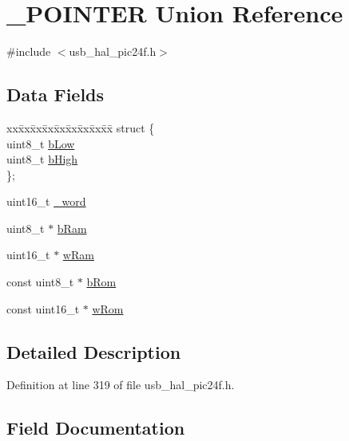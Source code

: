 \hypertarget{union___p_o_i_n_t_e_r}{}\section{\+\_\+\+P\+O\+I\+N\+T\+ER Union Reference}
\label{union___p_o_i_n_t_e_r}


{\ttfamily \#include $<$usb\+\_\+hal\+\_\+pic24f.\+h$>$}

\subsection*{Data Fields}
\begin{DoxyCompactItemize}
\item 
\begin{tabbing}
xx\=xx\=xx\=xx\=xx\=xx\=xx\=xx\=xx\=\kill
struct \{\\
\>uint8\_t \mbox{\hyperlink{union___p_o_i_n_t_e_r_a4fd529a929a6e33cb6216934961a8cf0}{bLow}}\\
\>uint8\_t \mbox{\hyperlink{union___p_o_i_n_t_e_r_a9415d74951bbdb3ae28bc33b5db7d1e2}{bHigh}}\\
\}; \\

\end{tabbing}\item 
uint16\+\_\+t \mbox{\hyperlink{union___p_o_i_n_t_e_r_a957c357acebf129016c23a180c55a138}{\+\_\+word}}
\item 
uint8\+\_\+t $\ast$ \mbox{\hyperlink{union___p_o_i_n_t_e_r_ade44ba3aaf3f950f4c95a2eae3c52266}{b\+Ram}}
\item 
uint16\+\_\+t $\ast$ \mbox{\hyperlink{union___p_o_i_n_t_e_r_a7fbff1cee75fe5bc810c6872b4f7f2e7}{w\+Ram}}
\item 
const uint8\+\_\+t $\ast$ \mbox{\hyperlink{union___p_o_i_n_t_e_r_ad199f0db405ddec97c0679ba019934e7}{b\+Rom}}
\item 
const uint16\+\_\+t $\ast$ \mbox{\hyperlink{union___p_o_i_n_t_e_r_a6fd9e98c13e3aa04654f2c5ffd7e758f}{w\+Rom}}
\end{DoxyCompactItemize}


\subsection{Detailed Description}


Definition at line 319 of file usb\+\_\+hal\+\_\+pic24f.\+h.



\subsection{Field Documentation}
\mbox{\label{union___p_o_i_n_t_e_r_ad7c034606d6f409bf4386dfc34cdd1a2}} 

